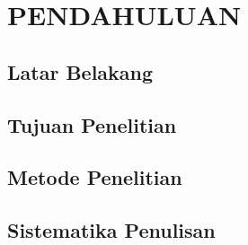 \chapter{PENDAHULUAN}
\section{Latar Belakang}
\lipsum[1-1]

\section{Tujuan Penelitian}

\section{Metode Penelitian}

\section{Sistematika Penulisan}

